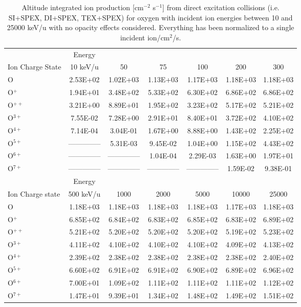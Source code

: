 \begin{table}[ht]
    \centering
    \caption{Altitude integrated ion production [cm$^{-2}$ s$^{-1}$] from direct excitation collisions (i.e. SI+SPEX, DI+SPEX, TEX+SPEX) for oxygen with incident ion energies between 10 and 25000 keV/u with no opacity effects considered. Everything has been normalized to a single incident ion/cm$^2$/s.}
    \begin{tabular}{l|c|c|c|c|c|c}
    \hline
    & Energy & & & & & \\
    Ion Charge State & 10 keV/u & 50 & 75 & 100 & 200 & 300 \\
    \hline
    O & 2.53E+02 & 1.02E+03 & 1.13E+03 & 1.17E+03 & 1.18E+03 & 1.18E+03 \\
    O$^+$ & 1.94E+01 & 3.48E+02 & 5.33E+02 & 6.30E+02 & 6.86E+02 & 6.86E+02 \\
    O$^{++}$ & 3.21E+00 & 8.89E+01 & 1.95E+02 & 3.23E+02 & 5.17E+02 & 5.21E+02 \\
    O$^{3+}$ & 7.55E-02 & 7.28E+00 & 2.91E+01 & 8.40E+01 & 3.72E+02 & 4.10E+02 \\
    O$^{4+}$ & 7.14E-04 & 3.04E-01 & 1.67E+00 & 8.88E+00 & 1.43E+02 & 2.25E+02 \\
    O$^{5+}$ & -------------- & 5.31E-03 & 9.45E-02 & 1.04E+00 & 1.15E+02 & 4.43E+02 \\
    O$^{6+}$ & -------------- & -------------- & 1.04E-04 & 2.29E-03 & 1.63E+00 & 1.97E+01 \\
    O$^{7+}$ & -------------- & -------------- & -------------- & -------------- & 1.59E-02 & 9.38E-01 \\
    \hline
    \hline
    & Energy & & & & & \\
    Ion Charge state & 500 keV/u & 1000 & 2000 & 5000 & 10000 & 25000 \\
    \hline
    O & 1.18E+03 & 1.18E+03 & 1.18E+03 & 1.18E+03 & 1.17E+03 & 1.18E+03 \\
    O$^+$ & 6.85E+02 & 6.84E+02 & 6.83E+02 & 6.85E+02 & 6.83E+02 & 6.89E+02 \\
    O$^{++}$ & 5.21E+02 & 5.20E+02 & 5.20E+02 & 5.20E+02 & 5.19E+02 & 5.23E+02 \\
    O$^{3+}$ & 4.11E+02 & 4.10E+02 & 4.10E+02 & 4.10E+02 & 4.09E+02 & 4.13E+02 \\
    O$^{4+}$ & 2.39E+02 & 2.38E+02 & 2.38E+02 & 2.38E+02 & 2.38E+02 & 2.40E+02 \\
    O$^{5+}$ & 6.60E+02 & 6.91E+02 & 6.91E+02 & 6.90E+02 & 6.89E+02 & 6.96E+02 \\
    O$^{6+}$ & 7.00E+01 & 1.09E+02 & 1.11E+02 & 1.11E+02 & 1.11E+02 & 1.12E+02 \\
    O$^{7+}$ & 1.47E+01 & 9.39E+01 & 1.34E+02 & 1.48E+02 & 1.49E+02 & 1.51E+02 \\
    \hline
    \end{tabular}
    \label{tab:OxyDEProd}
\end{table}

